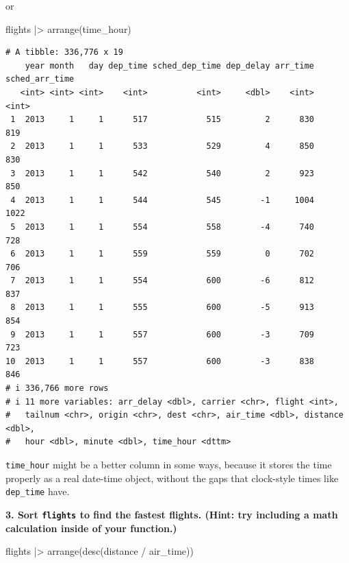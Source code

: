\documentclass[
  letterpaper,
  DIV=11,
  numbers=noendperiod]{scrreprt}
\newenvironment{Shaded}{\begin{snugshade}}{\end{snugshade}}
\newcommand{\FunctionTok}[1]{\textcolor[rgb]{0.28,0.35,0.67}{#1}}
\newcommand{\NormalTok}[1]{\textcolor[rgb]{0.00,0.23,0.31}{#1}}
\newcommand{\SpecialCharTok}[1]{\textcolor[rgb]{0.37,0.37,0.37}{#1}}
\begin{document}
or

\begin{Shaded}
\begin{Highlighting}[]
\NormalTok{flights }\SpecialCharTok{|\textgreater{}}
  \FunctionTok{arrange}\NormalTok{(time\_hour)}
\end{Highlighting}
\end{Shaded}

\begin{verbatim}
# A tibble: 336,776 x 19
    year month   day dep_time sched_dep_time dep_delay arr_time sched_arr_time
   <int> <int> <int>    <int>          <int>     <dbl>    <int>          <int>
 1  2013     1     1      517            515         2      830            819
 2  2013     1     1      533            529         4      850            830
 3  2013     1     1      542            540         2      923            850
 4  2013     1     1      544            545        -1     1004           1022
 5  2013     1     1      554            558        -4      740            728
 6  2013     1     1      559            559         0      702            706
 7  2013     1     1      554            600        -6      812            837
 8  2013     1     1      555            600        -5      913            854
 9  2013     1     1      557            600        -3      709            723
10  2013     1     1      557            600        -3      838            846
# i 336,766 more rows
# i 11 more variables: arr_delay <dbl>, carrier <chr>, flight <int>,
#   tailnum <chr>, origin <chr>, dest <chr>, air_time <dbl>, distance <dbl>,
#   hour <dbl>, minute <dbl>, time_hour <dttm>
\end{verbatim}

\texttt{time\_hour} might be a better column in some ways, because it
stores the time properly as a real date-time object, without the gaps
that clock-style times like \texttt{dep\_time} have.

\textbf{3. Sort \texttt{flights} to find the fastest flights. (Hint: try
including a math calculation inside of your function.)}

\begin{Shaded}
\begin{Highlighting}[]
\NormalTok{flights }\SpecialCharTok{|\textgreater{}}
  \FunctionTok{arrange}\NormalTok{(}\FunctionTok{desc}\NormalTok{(distance }\SpecialCharTok{/}\NormalTok{ air\_time))}
\end{Highlighting}
\end{Shaded}
\end{document}
